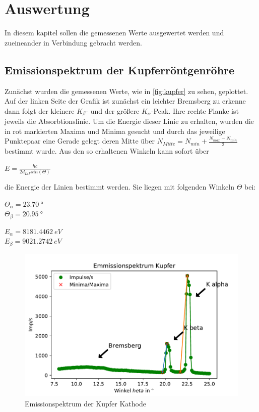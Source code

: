 \section{Auswertung}
\label{sec:auswertung}
In diesem kapitel sollen die gemessenen Werte ausgewertet werden und zueineander in Verbindung gebracht werden.
\subsection{Emissionspektrum der Kupferröntgenröhre}
\label{sec:emskupfer}
Zunächst wurden die gemessenen Werte, wie in \autoref{fig:kupfer} zu sehen, geplottet.
Auf der linken Seite der Grafik ist zunächst ein leichter Bremsberg zu erkenne dann folgt der kleinere
$K_{\beta}$- und der größere $K_{\alpha}$-Peak. Ihre rechte Flanke ist jeweils die Absorbtionslinie.
Um die Energie dieser Linie zu erhalten, wurden die in rot markierten Maxima und Minima gesucht und
durch das jeweilige Punktepaar eine Gerade gelegt deren Mitte über 
$N_{Mitte}=N_{min}+\frac{N_{max}-N_{min}}{2}$ bestimmt wurde. Aus den so erhaltenen Winkeln kann sofort über
\begin{center}
    $E=\frac{hc}{2d_{LiF}sin(\Theta)}$
\end{center}
die Energie der Linien bestimmt werden. Sie liegen mit folgenden Winkeln $\Theta$ bei:
\begin{center}
    $\Theta_{\alpha}=\SI[]{23.70}[]{°}$\\
    $\Theta_{\beta}=\SI[]{20.95}[]{°}$\\
\end{center}
\begin{center}
    $E_{\alpha}=\SI[]{8181.4462}[]{eV}$\\
    $E_{\beta}=\SI[]{9021.2742}[]{eV}$\\
\end{center}
\begin{figure}
    \centering
    \includegraphics{Kupfer.pdf}
    \caption{Emissionspektrum der Kupfer Kathode}
    \label{fig:kupfer}
  \end{figure}

